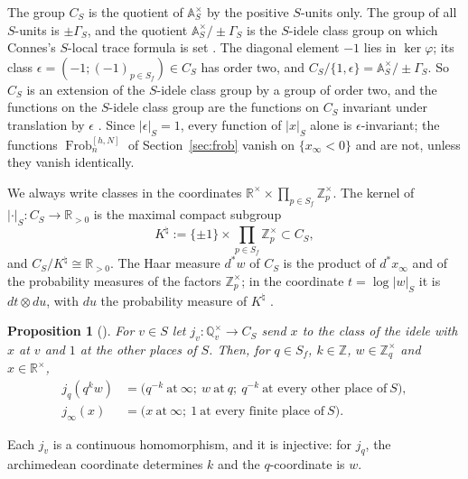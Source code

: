 \documentclass[11pt]{amsart}
\newtheorem{proposition}[theorem]{Proposition}
\theoremstyle{definition}
\newcommand{\R}{\mathbb R}
\newcommand{\Z}{\mathbb Z}
\newcommand{\Q}{\mathbb Q}
\newcommand{\A}{\mathbb A}
\newcommand{\Frob}{\operatorname{Frob}}
\newcommand{\Knat}{K^{\natural}}
\begin{document}
The group $C_S$ is the quotient of $\A_S^\times$ by the positive $S$-units
only. The group of all $S$-units is $\pm\Gamma_S$, and the quotient
$\A_S^\times/\pm\Gamma_S$ is the $S$-idele class group on which Connes's
$S$-local trace formula is set \cite[Section~VII]{Connes99}. The diagonal
element $-1$ lies in $\ker\varphi$; its class
$\epsilon=(-1;(-1)_{p\in S_f})\in C_S$ has order two, and
$C_S/\{1,\epsilon\}=\A_S^\times/\pm\Gamma_S$. So $C_S$ is an extension of the
$S$-idele class group by a group of order two, and the functions on the
$S$-idele class group are the functions on $C_S$ invariant under translation
by $\epsilon$ \cite[Lemma~2.5]{Companion}. Since $|\epsilon|_S=1$, every
function of $|x|_S$ alone is $\epsilon$-invariant; the functions
$\Frob_n^{[h,N]}$ of Section~\ref{sec:frob} vanish on $\{x_\infty<0\}$ and
are not, unless they vanish identically.

We always write classes in the coordinates
$\R^\times\times\prod_{p\in S_f}\Z_p^\times$. The kernel of
$|\cdot|_S:C_S\to\R_{>0}$ is the maximal compact subgroup
\begin{equation}\label{eq:Knat}
   \Knat:=\{\pm1\}\times\prod_{p\in S_f}\Z_p^\times\subset C_S ,
\end{equation}
and $C_S/\Knat\cong\R_{>0}$. The Haar measure $d^*w$ of $C_S$ is the product
of $d^*x_\infty$ and of the probability measures of the factors $\Z_p^\times$;
in the coordinate $t=\log|w|_S$ it is $dt\otimes du$, with $du$ the
probability measure of $\Knat$ \cite[(9)]{Companion}.

\begin{proposition}[{\cite[(28)]{Companion}}]\label{prop:slices}
For $v\in S$ let $j_v:\Q_v^\times\to C_S$ send $x$ to the class of the idele
with $x$ at $v$ and $1$ at the other places of $S$. Then, for $q\in S_f$,
$k\in\Z$, $w\in\Z_q^\times$ and $x\in\R^\times$,
\begin{align*}
  j_q(q^kw)&=\bigl(q^{-k}\ \text{at}\ \infty;\ w\ \text{at}\ q;\
     q^{-k}\ \text{at every other place of}\ S\bigr),\\
  j_\infty(x)&=\bigl(x\ \text{at}\ \infty;\ 1\ \text{at every finite place of}\
     S\bigr).
\end{align*}
\end{proposition}

\noindent Each $j_v$ is a continuous homomorphism, and it is injective: for
$j_q$, the archimedean coordinate determines $k$ and the $q$-coordinate is
$w$.
\end{document}
